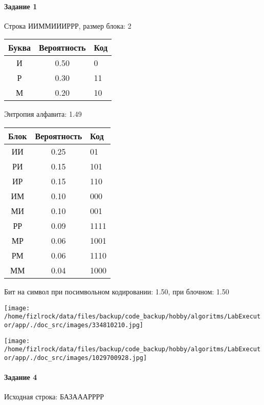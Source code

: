\documentclass[a4paper, 12pt]{article}
\begin{document}
\paragraph{Задание 1}

Строка ИИММИИИРРР, размер блока: 2
\begin{center}
 \begin{tabular}{ |c|c|l| } 
  \hline
     Буква & Вероятность & Код\\ \hline
И & 0.50 & 0\\\hline
Р & 0.30 & 11\\\hline
М & 0.20 & 10
\\ \hline \end{tabular}
\end{center}
Энтропия алфавита: 1.49
\begin{center}
 \begin{tabular}{ |c|c|l| } 
  \hline
     Блок & Вероятность & Код\\ \hline
ИИ & 0.25 & 01\\\hline
РИ & 0.15 & 101\\\hline
ИР & 0.15 & 110\\\hline
ИМ & 0.10 & 000\\\hline
МИ & 0.10 & 001\\\hline
РР & 0.09 & 1111\\\hline
МР & 0.06 & 1001\\\hline
РМ & 0.06 & 1110\\\hline
ММ & 0.04 & 1000
\\ \hline \end{tabular}
\end{center}
Бит на символ при посимвольном кодировании: 1.50, при блочном: 1.50

\texttt{[image: /home/fizlrock/data/files/backup/code\_backup/hobby/algoritms/LabExecutor/app/./doc\_src/images/334810210.jpg]}

\texttt{[image: /home/fizlrock/data/files/backup/code\_backup/hobby/algoritms/LabExecutor/app/./doc\_src/images/1029700928.jpg]}
\paragraph{Задание 4}


Исходная строка: БАЗАААРРРР
\end{document}
